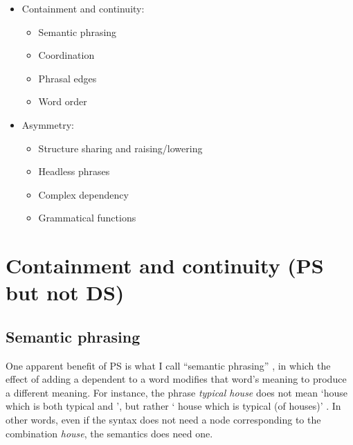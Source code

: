 \documentclass[output=paper
 	        ,biblatex
                ,babelshorthands
                ,newtxmath
                ,draftmode
                ,colorlinks, citecolor=brown
]{langscibook}
\begin{document}
\begin{itemize}
	\item  Containment and continuity:
	\begin{itemize}
		\item Semantic phrasing
		
		\item Coordination
		
		\item Phrasal edges
		
		\item Word order
	\end{itemize}

	\item Asymmetry:
	\begin{itemize}
		\item Structure sharing and raising/lowering
		
		\item Headless phrases
		
		\item Complex dependency
		
		\item Grammatical functions
	\end{itemize}
\end{itemize}


\section{Containment and continuity (PS but not DS)}
\label{sec:4}

\subsection{Semantic phrasing}
\label{sec:4.1}

One apparent benefit of PS is what I call ``semantic phrasing'' \citep[146–151]{Hudson90a-u}, in which the effect of adding a dependent to a word modifies that word’s meaning to produce a different meaning. For instance, the phrase \emph{typical  house} does not mean ‘house which is both typical and ’, but rather ‘ house which is typical (of  houses)’ \citep{Dahl80a}. In other words, even if the syntax does not need a node corresponding to the combination \emph{ house}, the semantics does need one.
\end{document}
